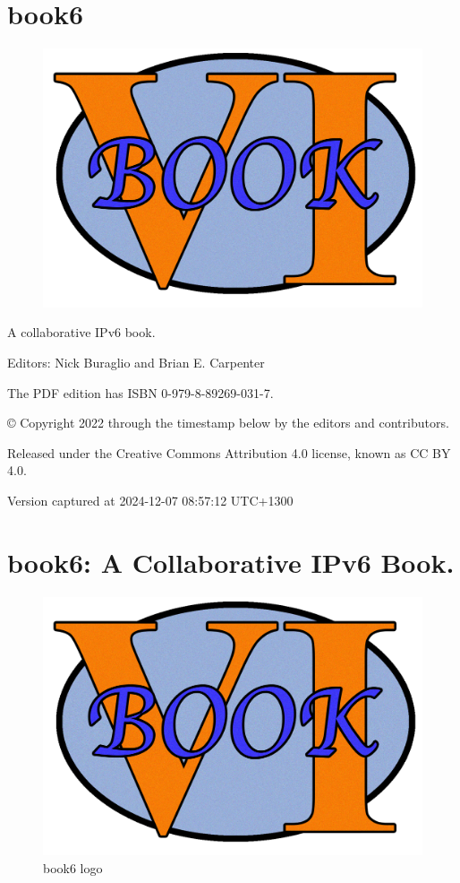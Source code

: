\documentclass[
]{article}
\author{}
\date{}
\begin{document}
\section{book6}\label{book6}

\begin{figure}
\centering
\includegraphics{book6logo.png}
\caption{}
\end{figure}

A collaborative IPv6 book.

Editors: Nick Buraglio and Brian E. Carpenter

The PDF edition has ISBN 0-979-8-89269-031-7.

© Copyright 2022 through the timestamp below by the editors and
contributors.

Released under the Creative Commons Attribution 4.0 license, known as CC
BY 4.0.

Version captured at 2024-12-07 08:57:12 UTC+1300

\pagebreak

\section{book6: A Collaborative IPv6
Book.}\label{book6-a-collaborative-ipv6-book}

\begin{figure}
\centering
\includegraphics{book6logo.png}
\caption{book6 logo}
\end{figure}
\end{document}

